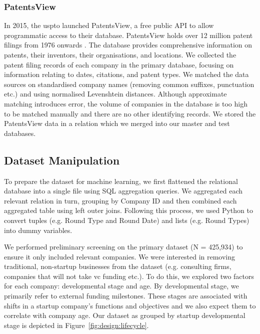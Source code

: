 \documentclass[../thesis/thesis.tex]{subfiles}
\begin{document}
\subsubsection{PatentsView}

In 2015, the \gls{uspto} launched PatentsView, a free public API to allow programmatic access to their database. PatentsView holds over 12 million patent filings from 1976 onwards \cite{schultz2016}. The database provides comprehensive information on patents, their inventors, their organisations, and locations. We collected the patent filing records of each company in the primary database, focusing on information relating to dates, citations, and patent types. We matched the data sources on standardised company names (removing common suffixes, punctuation etc.) and using normalised Levenshtein distances. Although approximate matching introduces error, the volume of companies in the database is too high to be matched manually and there are no other identifying records. We stored the PatentsView data in a relation which we merged into our master and test databases.

\subsection{Dataset Manipulation}

To prepare the dataset for machine learning, we first flattened the relational database into a single file using SQL aggregation queries. We aggregated each relevant relation in turn, grouping by Company ID and then combined each aggregated table using left outer joins. Following this process, we used Python to convert tuples (e.g. Round Type and Round Date) and lists (e.g. Round Types) into dummy variables.

We performed preliminary screening on the primary dataset (N = 425,934) to ensure it only included relevant companies. We were interested in removing traditional, non-startup businesses from the dataset (e.g. consulting firms, companies that will not take \gls{vc} funding etc.). To do this, we explored two factors for each company: developmental stage and age. By developmental stage, we primarily refer to external funding milestones. These stages are associated with shifts in a startup company's functions and objectives and we also expect them to correlate with company age. Our dataset as grouped by startup developmental stage is depicted in Figure~\ref{fig:design:lifecycle}.
\end{document}
